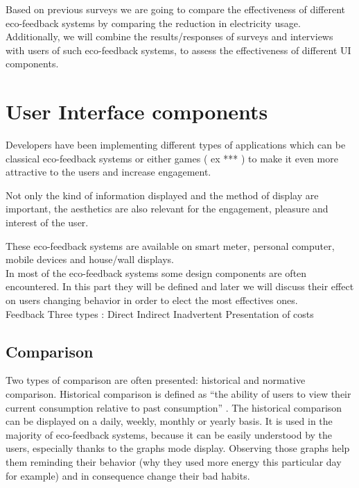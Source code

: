 \documentclass[journal]{vgtc}                %
\begin{document}
Based on previous surveys we are going to compare the effectiveness of different eco-feedback systems by comparing the reduction in electricity usage. Additionally, we will combine the results/responses of surveys and interviews with users of such eco-feedback systems, to assess the effectiveness of different UI components. 
%


\section{User Interface components}
Developers have been implementing different types of applications which can be classical eco-feedback systems or either games ( ex *** ) to make it even more attractive to the users and increase engagement.

Not only the kind of information displayed and the method of display are important, the aesthetics are also relevant for the engagement, pleasure and interest of the user\cite{bartram2015design}.

These eco-feedback systems are available on smart meter, personal computer, mobile devices and house/wall displays. \\ %

In most of the eco-feedback systems some design components are often encountered.
In this part they will be defined and later we will discuss their effect on users changing behavior in order to elect the most effectives ones. \\

Feedback
Three types : Direct
Indirect
Inadvertent
Presentation of costs

\subsection{Comparison }
Two types of comparison are often presented: historical and normative comparison.
Historical comparison is defined as  “the ability of users to view their current consumption relative to past consumption” . %
The historical comparison can be displayed on a daily, weekly, monthly or yearly basis. It is used in the majority of eco-feedback systems, because it can be easily understood by the users, especially thanks to the graphs mode display. Observing those graphs help them reminding their behavior (why they used more energy this particular day for example) and in consequence change their bad habits.
\end{document}

